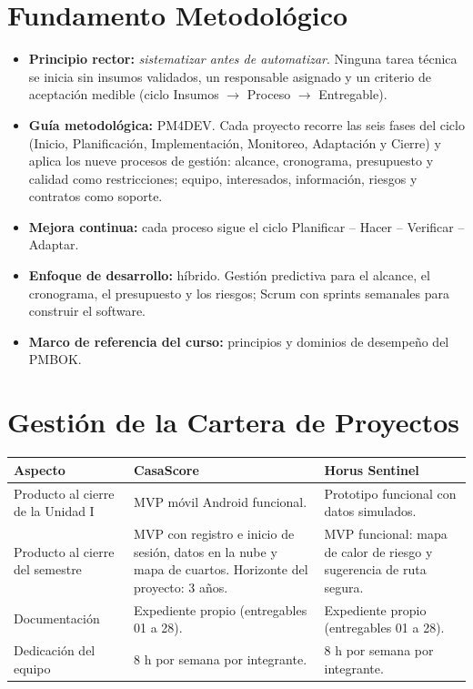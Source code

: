 \documentclass[11pt,a4paper]{article}
\begin{document}
\section{Fundamento Metodológico}
\begin{itemize}[leftmargin=*]
    \item \textbf{Principio rector:} \textit{sistematizar antes de automatizar}. Ninguna tarea técnica se inicia sin insumos validados, un responsable asignado y un criterio de aceptación medible (ciclo Insumos $\rightarrow$ Proceso $\rightarrow$ Entregable).
    \item \textbf{Guía metodológica:} PM4DEV. Cada proyecto recorre las seis fases del ciclo (Inicio, Planificación, Implementación, Monitoreo, Adaptación y Cierre) y aplica los nueve procesos de gestión: alcance, cronograma, presupuesto y calidad como restricciones; equipo, interesados, información, riesgos y contratos como soporte.
    \item \textbf{Mejora continua:} cada proceso sigue el ciclo Planificar -- Hacer -- Verificar -- Adaptar.
    \item \textbf{Enfoque de desarrollo:} híbrido. Gestión predictiva para el alcance, el cronograma, el presupuesto y los riesgos; Scrum con sprints semanales para construir el software.
    \item \textbf{Marco de referencia del curso:} principios y dominios de desempeño del PMBOK.
\end{itemize}

\section{Gestión de la Cartera de Proyectos}

\noindent\begin{tabularx}{\textwidth}{@{}P{3.4cm} L L@{}}
\toprule
{}
\textbf{Aspecto} & \textbf{CasaScore} & \textbf{Horus Sentinel} \\
\midrule
Producto al cierre de la Unidad I & MVP móvil Android funcional. & Prototipo funcional con datos simulados. \\
Producto al cierre del semestre & MVP con registro e inicio de sesión, datos en la nube y mapa de cuartos. Horizonte del proyecto: 3 años. & MVP funcional: mapa de calor de riesgo y sugerencia de ruta segura. \\
Documentación & Expediente propio (entregables 01 a 28). & Expediente propio (entregables 01 a 28). \\
Dedicación del equipo & 8 h por semana por integrante. & 8 h por semana por integrante. \\
\bottomrule
\end{tabularx}
\end{document}
